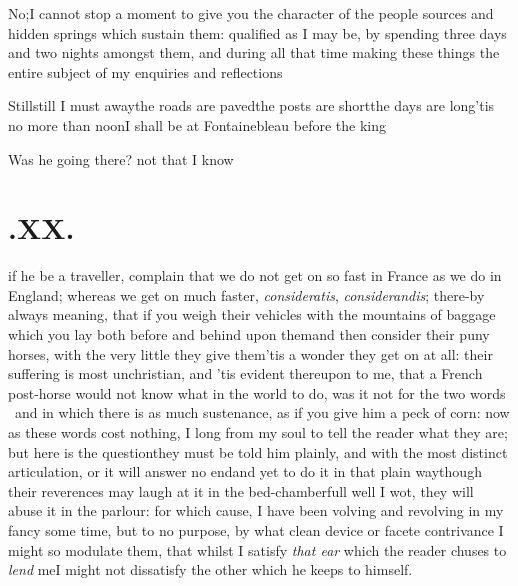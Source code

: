 \documentclass{article}
\begin{document}
\tsk No;\tsk I cannot stop a moment to give you the character of the people\break
{}
\break
sources and hidden springs which sustain them: qualified as I may be, by spending
three days and two nights amongst them, and during all that time making these things
the entire subject of my enquiries and reflections\tsh{}

Still\tsk still I must away\tsh the roads are paved\tsk the posts are short\tsk the days
are long\tsk ’tis no more than noon\tsk I shall be at Fontainebleau before the king\tsh

\tsh Was he going there? not that I know\tsh

\section{.\enspace XX.}

 \break
if he be a traveller, complain that\break
we do not get on so fast in France as we\break
do in England; whereas we get on much\break
faster, \textit{consideratis}, \textit{considerandis}; there-\break by always meaning, that if you
weigh their vehicles with the mountains of baggage which you lay both before and
behind upon them\tsk and then consider their puny horses, with the very little
they
give them\tsk ’tis a wonder they get on at all: their suffering
is most unchristian,\break
and ’tis evident thereupon to me, that a
French post-horse would not know what
in the world to do, was it not for the
two words \astvi\ and \astvi\break
in which there is as
much sustenance, as if you give him a peck of corn: now as these
words cost nothing, I long from my soul to tell the reader what
they are; but here is the question\tsk they must be told him
plainly, and with the most distinct articulation, or it will
answer no end\tsk and yet to do it in that plain way\tsk though
their reverences may laugh at it in the bed-chamber\tsk full
well I wot, they will abuse it in the parlour: for which cause,
I have been volving and revolving in my fancy some time, but to no
purpose, by what clean device or facete contrivance I might
so modulate them, that whilst I satisfy \textit{that ear} which
the reader chuses to \textit{lend} me\tsk I might not dissatisfy
the other which he keeps to himself.
\end{document}
